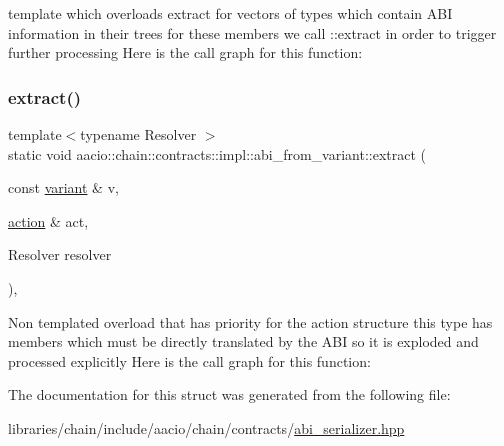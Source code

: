 template which overloads extract for vectors of types which contain A\+BI information in their trees for these members we call \+::extract in order to trigger further processing Here is the call graph for this function\+:
\mbox{\label{structaacio_1_1chain_1_1contracts_1_1impl_1_1abi__from__variant_a94db60a8aa274449117af1b9e5c18bba}} 
\subsubsection{\texorpdfstring{extract()}{extract()}\hspace{0.1cm}{\footnotesize\ttfamily [4/4]}}
{\footnotesize\ttfamily template$<$typename Resolver $>$ \\
static void aacio\+::chain\+::contracts\+::impl\+::abi\+\_\+from\+\_\+variant\+::extract (\begin{DoxyParamCaption}\item[{const \mbox{\hyperlink{classfc_1_1variant}{variant}} \&}]{v,  }\item[{\mbox{\hyperlink{structaacio_1_1chain_1_1action}{action}} \&}]{act,  }\item[{Resolver}]{resolver }\end{DoxyParamCaption})\hspace{0.3cm}{\ttfamily [inline]}, {\ttfamily [static]}}

Non templated overload that has priority for the action structure this type has members which must be directly translated by the A\+BI so it is exploded and processed explicitly Here is the call graph for this function\+:


The documentation for this struct was generated from the following file\+:\begin{DoxyCompactItemize}
\item 
libraries/chain/include/aacio/chain/contracts/\mbox{\hyperlink{abi__serializer_8hpp}{abi\+\_\+serializer.\+hpp}}\end{DoxyCompactItemize}
